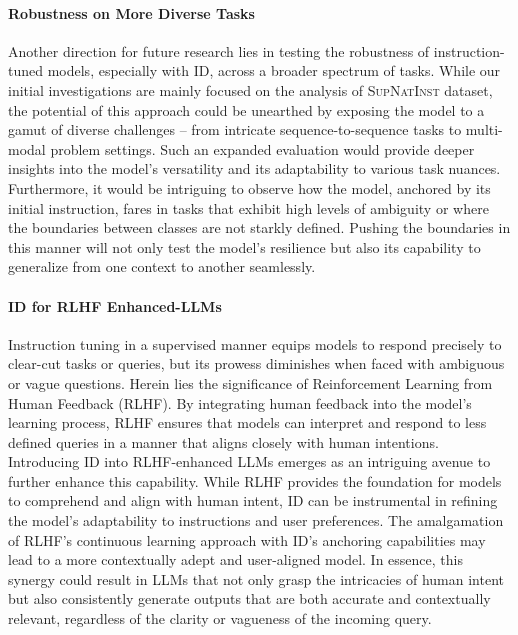 \paragraph{Robustness on More Diverse Tasks}
Another direction for future research lies in testing the robustness of instruction-tuned models, especially with ID, across a broader spectrum of tasks. While our initial investigations are mainly focused on the analysis of \textsc{SupNatInst} dataset, the potential of this approach could be unearthed by exposing the model to a gamut of diverse challenges – from intricate sequence-to-sequence tasks to multi-modal problem settings. Such an expanded evaluation would provide deeper insights into the model's versatility and its adaptability to various task nuances. Furthermore, it would be intriguing to observe how the model, anchored by its initial instruction, fares in tasks that exhibit high levels of ambiguity or where the boundaries between classes are not starkly defined. Pushing the boundaries in this manner will not only test the model's resilience but also its capability to generalize from one context to another seamlessly.

\paragraph{ID for RLHF Enhanced-LLMs}
Instruction tuning in a supervised manner equips models to respond precisely to clear-cut tasks or queries, but its prowess diminishes when faced with ambiguous or vague questions. Herein lies the significance of Reinforcement Learning from Human Feedback (RLHF). By integrating human feedback into the model's learning process, RLHF ensures that models can interpret and respond to less defined queries in a manner that aligns closely with human intentions. Introducing ID into RLHF-enhanced LLMs emerges as an intriguing avenue to further enhance this capability. While RLHF provides the foundation for models to comprehend and align with human intent, ID can be instrumental in refining the model's adaptability to instructions and user preferences. The amalgamation of RLHF's continuous learning approach with ID's anchoring capabilities may lead to a more contextually adept and user-aligned model. In essence, this synergy could result in LLMs that not only grasp the intricacies of human intent but also consistently generate outputs that are both accurate and contextually relevant, regardless of the clarity or vagueness of the incoming query.


